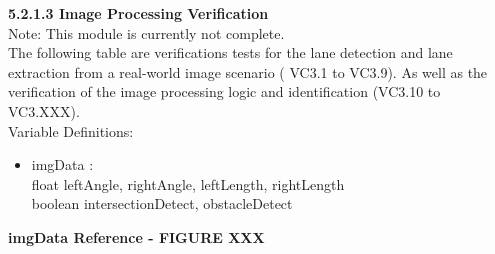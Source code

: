 \documentclass [10pt]{article}
\begin{document}
    \textbf{5.2.1.3 Image Processing Verification} \vspace{2mm}\\
    Note: This module is currently not complete. \\
    The following table are verifications tests for the lane detection and lane extraction from a real-world image scenario ( VC3.1 to VC3.9). As well as the verification of the image processing logic and identification (VC3.10 to VC3.XXX). \\
    Variable Definitions: \\ \newpage
    \begin{itemize}[topsep=0pt]
        \item imgData : \\ 
            float leftAngle,  rightAngle,  leftLength, rightLength \\
            boolean intersectionDetect, obstacleDetect
    \end{itemize}
    \textbf{imgData Reference - FIGURE XXX}
    \vspace{0.5cm}
    
\end{document}
